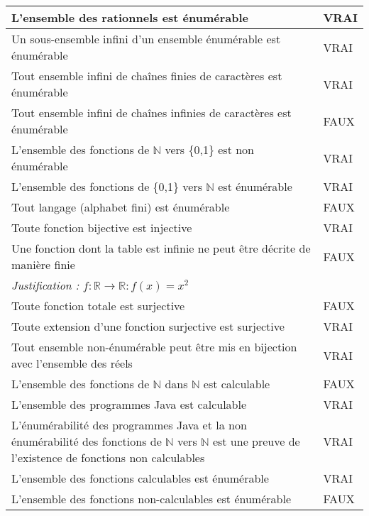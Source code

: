 \begin{tabular}{p{13cm}|l}
  L'ensemble des rationnels est énumérable & VRAI \\ \hline
  Un sous-ensemble infini d'un ensemble énumérable est énumérable & VRAI \\ \hline
  Tout ensemble infini de chaînes finies de caractères est énumérable & VRAI \\ \hline
  Tout ensemble infini de chaînes infinies de caractères est énumérable & FAUX \\ \hline
  L'ensemble des fonctions de $\mathbb{N}$ vers \{0,1\} est non énumérable & VRAI \\ \hline
  L'ensemble des fonctions de \{0,1\} vers $\mathbb{N}$ est énumérable & VRAI \\ \hline
  Tout langage (alphabet fini) est énumérable & FAUX \\ \hline
  Toute fonction bijective est injective & VRAI \\ \hline
  Une fonction dont la table est infinie ne peut être décrite de manière finie & FAUX \\
  \textit{Justification :} $f:\mathbb{R}\rightarrow\mathbb{R} : f(x)=x^{2}$ & \\ \hline
  Toute fonction totale est surjective & FAUX \\ \hline
  Toute extension d'une fonction surjective est surjective & VRAI \\ \hline
  Tout ensemble non-énumérable peut être mis en bijection avec l'ensemble des réels & VRAI \\ \hline
  L'ensemble des fonctions de $\mathbb{N}$ dans $\mathbb{N}$ est calculable & FAUX \\ \hline
  L'ensemble des programmes Java est calculable & VRAI \\ \hline
  L'énumérabilité des programmes Java et la non énumérabilité des fonctions de $\mathbb{N}$ vers $\mathbb{N}$ est une preuve de l'existence de fonctions non calculables & VRAI \\ \hline
  L'ensemble des fonctions calculables est énumérable & VRAI \\ \hline
  L'ensemble des fonctions non-calculables est énumérable & FAUX \\
\end{tabular}
